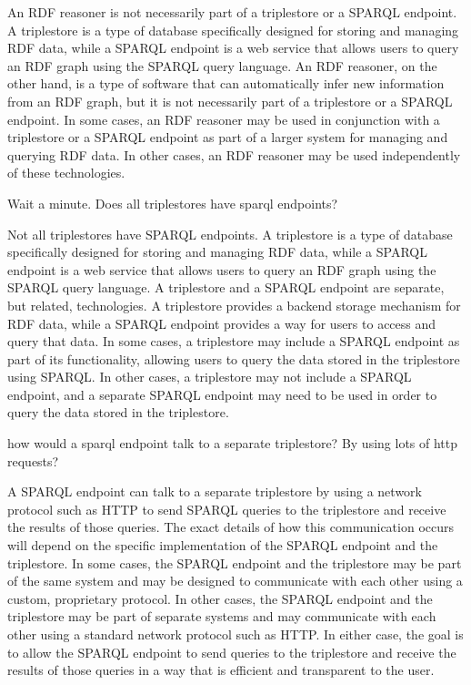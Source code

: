 \begin{description}
	\gpt An RDF reasoner is not necessarily part of a triplestore or a SPARQL endpoint. A triplestore is a type of database specifically designed for storing and managing RDF data, while a SPARQL endpoint is a web service that allows users to query an RDF graph using the SPARQL query language. An RDF reasoner, on the other hand, is a type of software that can automatically infer new information from an RDF graph, but it is not necessarily part of a triplestore or a SPARQL endpoint. In some cases, an RDF reasoner may be used in conjunction with a triplestore or a SPARQL endpoint as part of a larger system for managing and querying RDF data. In other cases, an RDF reasoner may be used independently of these technologies.
	
	\me Wait a minute. Does all triplestores have sparql endpoints?
	
	\gpt Not all triplestores have SPARQL endpoints. A triplestore is a type of database specifically designed for storing and managing RDF data, while a SPARQL endpoint is a web service that allows users to query an RDF graph using the SPARQL query language. A triplestore and a SPARQL endpoint are separate, but related, technologies. A triplestore provides a backend storage mechanism for RDF data, while a SPARQL endpoint provides a way for users to access and query that data. In some cases, a triplestore may include a SPARQL endpoint as part of its functionality, allowing users to query the data stored in the triplestore using SPARQL. In other cases, a triplestore may not include a SPARQL endpoint, and a separate SPARQL endpoint may need to be used in order to query the data stored in the triplestore.
	
	\me how would a sparql endpoint talk to a separate triplestore? By using lots of http requests?
	
	\gpt A SPARQL endpoint can talk to a separate triplestore by using a network protocol such as HTTP to send SPARQL queries to the triplestore and receive the results of those queries. The exact details of how this communication occurs will depend on the specific implementation of the SPARQL endpoint and the triplestore. In some cases, the SPARQL endpoint and the triplestore may be part of the same system and may be designed to communicate with each other using a custom, proprietary protocol. In other cases, the SPARQL endpoint and the triplestore may be part of separate systems and may communicate with each other using a standard network protocol such as HTTP. In either case, the goal is to allow the SPARQL endpoint to send queries to the triplestore and receive the results of those queries in a way that is efficient and transparent to the user.
	

\end{description}
